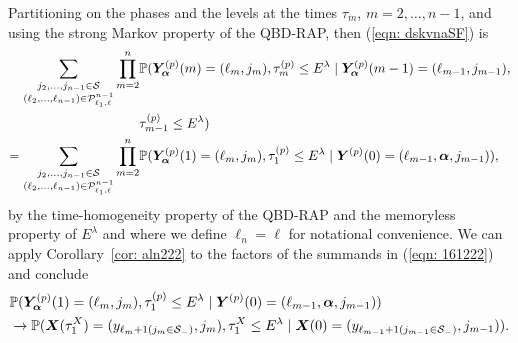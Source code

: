 Partitioning on the phases and the levels at the times \(\tau_m\), \(m=2,\dots,n-1\), and using the strong Markov property of the QBD-RAP, then (\ref{eqn: dskvnaSF}) is  
	\begin{align}
		\sum_{\substack{j_2,\dots,j_{n-1}\in\mathcal S \\ (\ell_2,\dots,\ell_{n-1}) \in\mathcal P^{n-1}_{\ell_1,\ell}}}\prod_{m=2}^{n}&\mathbb P(\bm{Y}_{\bm{\alpha}}^{(p)}(m) =(\ell_m, j_m), 
		\tau_{m}^{(p)}\leq E^\lambda 
		\mid  \nonumber 
\bm{Y}_{\bm{\alpha}}^{(p)} (m-1) = (\ell_{m-1}, j_{m-1}), \\&\tau_{m-1}^{(p)}\leq E^\lambda ) \nonumber
		\\=\sum_{\substack{j_2,\dots,j_{n-1}\in\mathcal S \\ (\ell_2,\dots,\ell_{n-1}) \in\mathcal P^{n-1}_{\ell_1,\ell}}}\prod_{m=2}^{n}&\mathbb P(\bm{Y}_{\bm{\alpha}}^{(p)}(1) =(\ell_m, j_m), \tau_{1}^{(p)}\leq E^\lambda 
            	 \mid  
	 	\boldsymbol Y^{(p)}(0) = (\ell_{m-1},\boldsymbol \alpha, j_{m-1})),  \label{eqn: 161222}
\end{align}
by the time-homogeneity property of the QBD-RAP and the memoryless property of \(E^\lambda\) and where we define \(\ell_n=\ell\) for notational convenience. %
We can apply Corollary~\ref{cor: aln222} to the factors of the summands in (\ref{eqn: 161222}) and conclude 
\begin{align}
	& \mathbb P(\bm{Y}_{\bm{\alpha}}^{(p)}(1) = (\ell_m, j_m), \tau_{1}^{(p)}\leq E^\lambda 
            	 \mid \boldsymbol Y^{(p)}(0) = (\ell_{m-1},\boldsymbol \alpha, j_{m-1}))\nonumber
	\\&\to \mathbb P(\boldsymbol X(\tau_1^X) =( y_{\ell_{m}+1(j_m\in\mathcal{S}_-)},j_m), \tau_{1}^X\leq E^\lambda 
	\mid \boldsymbol X(0) = (y_{\ell_{m-1}+1(j_{m-1}\in\mathcal{S}_-)}, j_{m-1})).  \label{eqn:kknvf fawoprgj v2}
\end{align}

